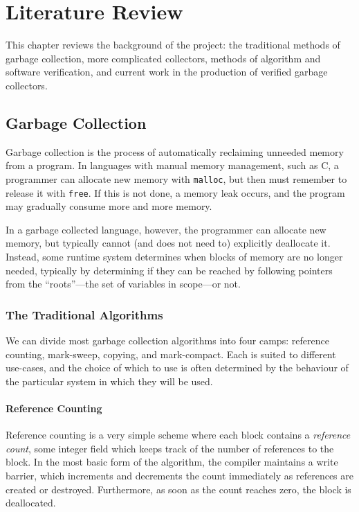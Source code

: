 \chapter{Literature Review}

This chapter reviews the background of the project: the traditional
methods of garbage collection, more complicated collectors, methods of
algorithm and software verification, and current work in the
production of verified garbage collectors.

\section{Garbage Collection}

Garbage collection is the process of automatically reclaiming unneeded
memory from a program. In languages with manual memory management,
such as C, a programmer can allocate new memory with \texttt{malloc},
but then must remember to release it with \texttt{free}. If this is
not done, a memory leak occurs, and the program may gradually consume
more and more memory.

In a garbage collected language, however, the programmer can allocate
new memory, but typically cannot (and does not need to) explicitly
deallocate it. Instead, some runtime system determines when blocks of
memory are no longer needed, typically by determining if they can be
reached by following pointers from the ``roots''---the set of
variables in scope---or not.

\subsection{The Traditional Algorithms}

We can divide most garbage collection algorithms into four camps:
reference counting, mark-sweep, copying, and mark-compact. Each is
suited to different use-cases, and the choice of which to use is often
determined by the behaviour of the particular system in which they
will be used.

\subsubsection{Reference Counting}

Reference counting is a very simple scheme where each block contains a
\textit{reference count}, some integer field which keeps track of the
number of references to the block. In the most basic form of the
algorithm, the compiler maintains a write barrier, which increments
and decrements the count immediately as references are created or
destroyed. Furthermore, as soon as the count reaches zero, the block
is deallocated\cite{Collins60}.

